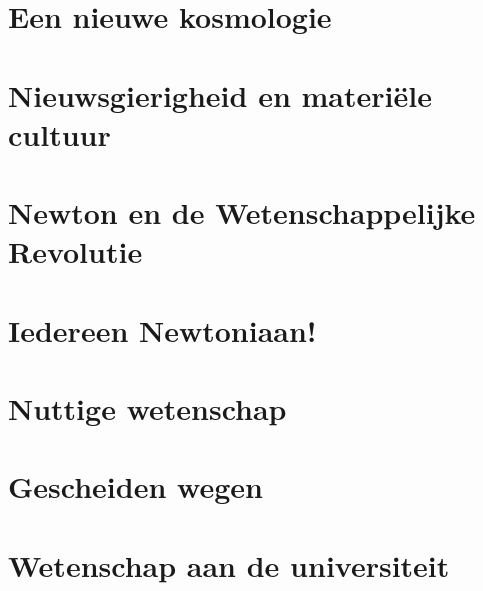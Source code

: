 \documentclass{article}
\begin{document}
  \section{Een nieuwe kosmologie}

  \newpage
  \section{Nieuwsgierigheid en materi\"ele cultuur}

  \newpage
  \section{Newton en de Wetenschappelijke Revolutie}

  \newpage
  \section{Iedereen Newtoniaan!}

  \newpage
  \section{Nuttige wetenschap}

  \newpage
  \section{Gescheiden wegen}

  \newpage
  \section{Wetenschap aan de universiteit}
\end{document}
